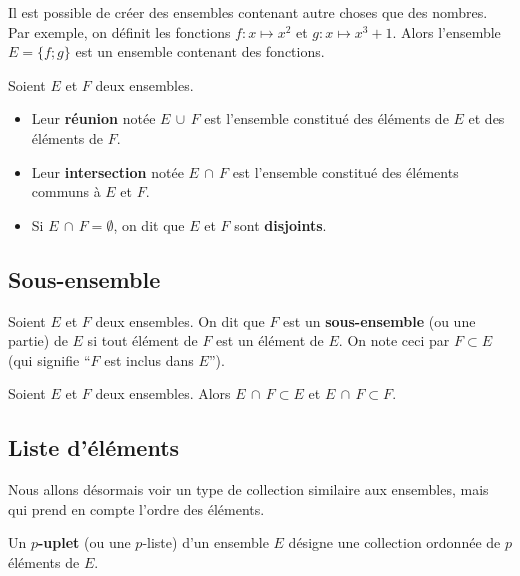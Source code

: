	\begin{tip}
		Il est possible de créer des ensembles contenant autre choses que des nombres. Par exemple, on définit les fonctions $f : x \mapsto x^2$ et $g : x \mapsto x^3 + 1$. Alors l'ensemble $E = \{f; g\}$ est un ensemble contenant des fonctions.
	\end{tip}

	\begin{formula}
		Soient $E$ et $F$ deux ensembles.
		\begin{itemize}
			\item Leur \textbf{réunion} notée $E \, \cup \, F$ est l'ensemble constitué des éléments de $E$ et des éléments de $F$.
			\item Leur \textbf{intersection} notée $E \, \cap \, F$ est l'ensemble constitué des éléments communs à $E$ et $F$.
			\item Si $E \, \cap \, F = \emptyset$, on dit que $E$ et $F$ sont \textbf{disjoints}.
		\end{itemize}
	\end{formula}

	\subsection{Sous-ensemble}

	\begin{formula}[Définition]
		Soient $E$ et $F$ deux ensembles. On dit que $F$ est un \textbf{sous-ensemble} (ou une partie) de $E$ si tout élément de $F$ est un élément de $E$.
		\newpar
		On note ceci par $F \subset E$ (qui signifie ``$F$ est inclus dans $E$'').
	\end{formula}


	\begin{tip}[Exemple]
		Soient $E$ et $F$ deux ensembles. Alors $E \, \cap \, F \subset E$ et $E \, \cap \, F \subset F$.
	\end{tip}

	\subsection{Liste d'éléments}

	Nous allons désormais voir un type de collection similaire aux ensembles, mais qui prend en compte l'ordre des éléments.

	\begin{formula}[Définition]
		Un \textbf{$p$-uplet} (ou une $p$-liste) d'un ensemble $E$ désigne une collection ordonnée de $p$ éléments de $E$.
	\end{formula}

